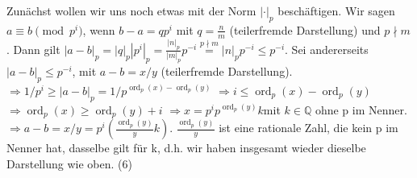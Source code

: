 \documentclass[12pt,ngerman]{scrartcl}
\DeclareMathOperator{\ord}{ord}
\begin{document}
Zunächst wollen wir uns noch etwas mit der Norm $|\cdot|_p$ beschäftigen. Wir sagen $a \equiv b \pmod {p^i}$, wenn $b-a=qp^i$ mit $q=\frac{n}{m}$ (teilerfremde Darstellung) und $p \nmid m$. Dann gilt  $|a-b|_p=|q|_p|p^i|_p = \frac{|n|_p}{|m|_p}p^{-i} \overset{p \nmid m}{=} |n|_p p^{-i} \le p^{-i}$. Sei andererseits $|a-b|_p \le p^{-i}$, mit $a-b=x/y$ (teilerfremde Darstellung). $\Rightarrow 1/p^i \ge |a-b|_p = 1/{p^{\ord_p(x)-\ord_p(y)}}$ $\Rightarrow i \le \ord_p(x)-\ord_p(y)$ $\Rightarrow \ord_p(x) \ge \ord_p(y)+i$ $\Rightarrow x=p^{i}p^{\ord_p(y)}k$mit $k \in \mathbb{Q}$ ohne p im Nenner. $\Rightarrow a-b=x/y=p^i(\frac{\ord_p(y)}{y}k)$. $\frac{\ord_p(y)}{y}$ ist eine rationale Zahl, die kein p im Nenner hat, dasselbe gilt für k, d.h. wir haben insgesamt wieder dieselbe Darstellung wie oben. (6)\\
\end{document}
